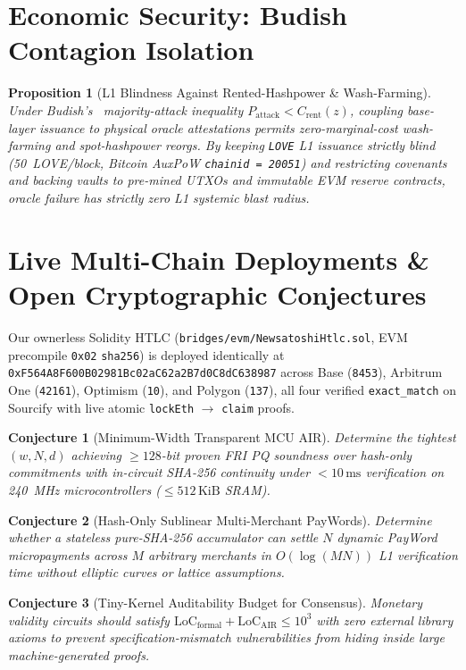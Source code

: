 \documentclass[11pt,a4paper]{article}
\newtheorem{proposition}{Proposition}
\newtheorem{conjecture}{Conjecture}
\begin{document}
\section{Economic Security: Budish Contagion Isolation}
\begin{proposition}[L1 Blindness Against Rented-Hashpower \& Wash-Farming]
Under Budish's~\cite{budish2018} majority-attack inequality $P_{\text{attack}} < C_{\text{rent}}(z)$, coupling base-layer issuance to physical oracle attestations permits zero-marginal-cost wash-farming and spot-hashpower reorgs. By keeping \texttt{LOVE} L1 issuance strictly blind (50~LOVE/block, Bitcoin AuxPoW \texttt{chainid = 20051}) and restricting covenants and backing vaults to pre-mined UTXOs and immutable EVM reserve contracts, oracle failure has strictly zero L1 systemic blast radius.
\end{proposition}

\section{Live Multi-Chain Deployments \& Open Cryptographic Conjectures}
Our ownerless Solidity HTLC (\texttt{bridges/evm/NewsatoshiHtlc.sol}, EVM precompile \texttt{0x02} \texttt{sha256}) is deployed identically at \texttt{0xF564A8F600B02981Bc02aC62a2B7d0C8dC638987} across Base (\texttt{8453}), Arbitrum One (\texttt{42161}), Optimism (\texttt{10}), and Polygon (\texttt{137}), all four verified \texttt{exact\_match} on Sourcify with live atomic \texttt{lockEth} $\to$ \texttt{claim} proofs.

\begin{conjecture}[Minimum-Width Transparent MCU AIR]
Determine the tightest $(w, N, d)$ achieving $\ge 128$-bit proven FRI PQ soundness over hash-only commitments with in-circuit SHA-256 continuity under $<10\,\text{ms}$ verification on 240~MHz microcontrollers ($\le 512\,\text{KiB}$ SRAM).
\end{conjecture}

\begin{conjecture}[Hash-Only Sublinear Multi-Merchant PayWords]
Determine whether a stateless pure-SHA-256 accumulator can settle $N$ dynamic PayWord micropayments across $M$ arbitrary merchants in $O(\log(MN))$ L1 verification time without elliptic curves or lattice assumptions.
\end{conjecture}

\begin{conjecture}[Tiny-Kernel Auditability Budget for Consensus]
Monetary validity circuits should satisfy $\mathrm{LoC}_{\text{formal}} + \mathrm{LoC}_{\text{AIR}} \le 10^3$ with zero external library axioms to prevent specification-mismatch vulnerabilities from hiding inside large machine-generated proofs.
\end{conjecture}
\end{document}
